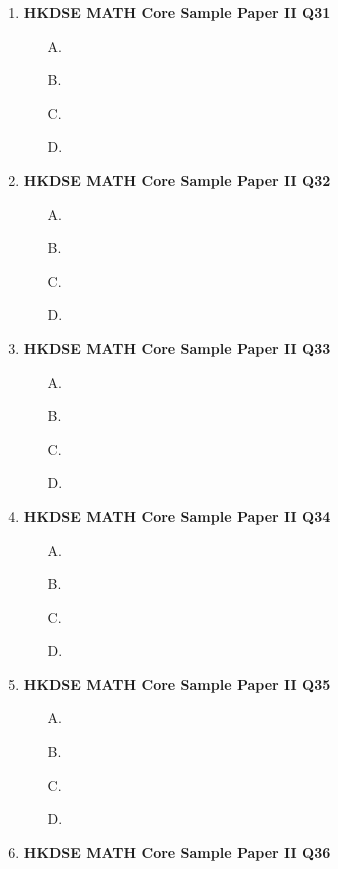 \documentclass[12pt]{article}
\begin{document}
\begin{enumerate}
\begin{enumerate}
		\item[B.]
		\item[C.]
		\item[D.]
	\end{enumerate}
	\item \textbf{HKDSE MATH Core Sample Paper II Q31}\\
	\begin{enumerate}
		\item[A.]
		\item[B.]
		\item[C.]
		\item[D.]
	\end{enumerate}
	\item \textbf{HKDSE MATH Core Sample Paper II Q32}\\
	\begin{enumerate}
		\item[A.]
		\item[B.]
		\item[C.]
		\item[D.]
	\end{enumerate}
	\item \textbf{HKDSE MATH Core Sample Paper II Q33}\\
	\begin{enumerate}
		\item[A.]
		\item[B.]
		\item[C.]
		\item[D.]
	\end{enumerate}
	\item \textbf{HKDSE MATH Core Sample Paper II Q34}\\
	\begin{enumerate}
		\item[A.]
		\item[B.]
		\item[C.]
		\item[D.]
	\end{enumerate}
	\item \textbf{HKDSE MATH Core Sample Paper II Q35}\\
	\begin{enumerate}
		\item[A.]
		\item[B.]
		\item[C.]
		\item[D.]
	\end{enumerate}
	\item \textbf{HKDSE MATH Core Sample Paper II Q36}\\

\end{enumerate}
\end{document}
